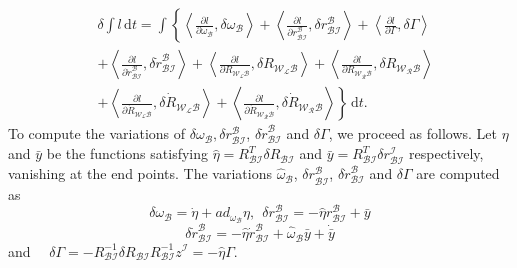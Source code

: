 \documentclass[letterpaper, 10 pt, conference]{ieeeconf}  \newcommand{\RN}[1]{\textup{\uppercase\expandafter{\romannumeral#1}}}
\begin{document}
\begin{align}
& \delta  \int \mathit{l}\, \mathrm dt = \int \left\{ \left\langle \frac{\partial \mathit{l}}{\partial \omega_{\mathcal{B}}},\delta \omega_{\mathcal{B}}\right\rangle + \left\langle  \frac{\partial \mathit{l}}{\partial r_{\mathcal{BI}}^{\mathcal{B}}},\delta r_{\mathcal{BI}}^{\mathcal{B}}\right\rangle + \left\langle  \frac{\partial \mathit{l}}{\partial \Gamma},\delta \Gamma \right\rangle  \right. \nonumber \\
&  + \left. \left\langle  \frac{\partial \mathit{l}}{\partial \dot{r}_{\mathcal{BI}}^{\mathcal{B}}},\delta \dot{r}_{\mathcal{BI}}^{\mathcal{B}}\right\rangle + \left\langle  \frac{\partial \mathit{l}}{\partial R_{\mathcal{W_LB}}},\delta R_{\mathcal{W_LB}} \right\rangle + \left\langle  \frac{\partial \mathit{l}}{\partial R_{\mathcal{W_RB}}},\delta R_{\mathcal{W_RB}} \right\rangle \right. \nonumber 
\\
&  + \left.  \left\langle  \frac{\partial \mathit{l}}{\partial \dot{R}_{\mathcal{W_LB}}},\delta \dot{R}_{\mathcal{W_LB}} \right\rangle + \left\langle  \frac{\partial \mathit{l}}{\partial \dot{R}_{\mathcal{W_RB}}},\delta \dot{R}_{\mathcal{W_RB}}\right\rangle  \right\} \, \mathrm dt. \label{variation}
\end{align}
To compute the variations of $\delta \omega_{\mathcal{B}},\delta r_{\mathcal{BI}}^{\mathcal{B}}$, $\delta \dot{r}_{\mathcal{BI}}^{\mathcal{B}}$ and $\delta \Gamma $, we proceed as follows. Let $\eta$ and $\bar{y}$ be the functions satisfying $\widehat{\eta}= R_{\mathcal{BI}}^{T}\delta R_{\mathcal{BI}}$ and $\bar{y}=R_{\mathcal{BI}}^{T} \delta r_{\mathcal{BI}}^{\mathcal{I}}$ respectively, vanishing at the end points. The variations $\widehat{\omega}_{\mathcal{B}}$, $\delta r_{\mathcal{BI}}^{\mathcal{B}}$, $\delta \dot{r}_{\mathcal{BI}}^{\mathcal{B}}$ and $\delta \Gamma$ are computed as
$$ \delta \omega_{\mathcal{B}} = \dot{\eta} + ad_{\omega_{\mathcal{B}}}\eta, ~~ \delta r_{\mathcal{BI}}^{\mathcal{B}} =-\widehat{\eta}r_{\mathcal{BI}}^{\mathcal{B}} +\bar{y}$$
$$\delta \dot{r}_{\mathcal{BI}}^{\mathcal{B}} =-\widehat{\eta}\dot{r}_{\mathcal{BI}}^{\mathcal{B}} +\widehat{\omega}_{\mathcal{B}}\bar{y} +\dot{\bar{y}} $$ and $\quad \delta \Gamma = -R_{\mathcal{BI}}^{-1}\delta R_{\mathcal{BI}}R_{\mathcal{BI}}^{-1} z^{\mathcal{I}}= -\widehat{\eta}\Gamma.$
\end{document}
